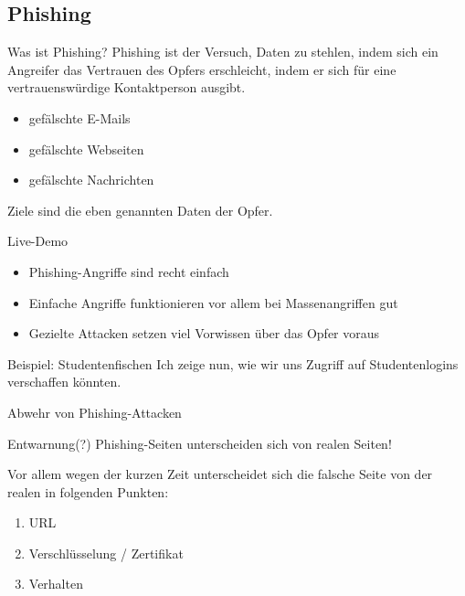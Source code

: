 \documentclass[hyperref={colorlinks,linkcolor=blue}, utf8]{beamer}
\begin{document}
	\subsection{Phishing}
	\begin{frame}
		\begin{block}{Was ist Phishing?}
			Phishing ist der Versuch, Daten zu stehlen, indem sich ein Angreifer das Vertrauen des Opfers erschleicht, indem er sich für eine vertrauenswürdige Kontaktperson ausgibt.
		\end{block}
		
		\begin{itemize}
			\item gefälschte E-Mails
			\item gefälschte Webseiten
			\item gefälschte Nachrichten
		\end{itemize}
	
		\alert{Ziele sind die eben genannten Daten der Opfer.}		
	\end{frame}

	\begin{frame}{Live-Demo}
		\begin{itemize}
			\item Phishing-Angriffe sind recht einfach
			\item Einfache Angriffe funktionieren vor allem bei Massenangriffen gut
			\item Gezielte Attacken setzen viel Vorwissen über das Opfer voraus
		\end{itemize}
	
		\begin{exampleblock}{Beispiel: Studentenfischen}
			Ich zeige nun, wie wir uns Zugriff auf Studentenlogins verschaffen könnten.
		\end{exampleblock}
	\end{frame}
	
	\begin{frame}{Abwehr von Phishing-Attacken}
		\begin{alertblock}{Entwarnung(?)}
			Phishing-Seiten unterscheiden sich von realen Seiten!
		\end{alertblock}
	
		Vor allem wegen der kurzen Zeit unterscheidet sich die falsche Seite von der realen in folgenden Punkten:
		\begin{enumerate}
			\item URL
			\item Verschlüsselung / Zertifikat
			\item Verhalten
		\end{enumerate}		
	\end{frame}
	
\end{document}

